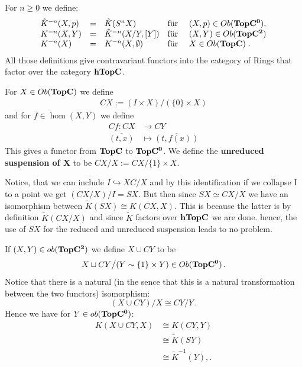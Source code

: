 \begin{definition}
	For $n\geq 0$ we define:
	\begin{align*}
		\begin{array}{lclll}
			\Tilde{K}^{-n}(X,p)&= &\Tilde{K}(S^nX)& \text{für } &(X,p)\in Ob(\operatorname{\mathbf{TopC^0}}),\\
			K^{-n}(X,Y)&= &\Tilde{K}^{-n}(X\slash Y,[Y]) &\text{für } &(X,Y)\in Ob(\operatorname{\mathbf{TopC^2}})\\
			K^{-n}(X) &= &K^{-n}(X,\emptyset) &\text{für } &X\in Ob(\operatorname{\mathbf{TopC}})~.
		\end{array}
	\end{align*}
	All those definitions give contravariant functors into the category of Rings that factor over the category $\operatorname{\mathbf{hTopC}}$.
\end{definition}
\begin{definition}\label{def: Cone on X}
	For $X\in Ob(\operatorname{\mathbf{TopC}})$ we define
	\begin{align*}
		CX:=(I\times X) \big/(\{0\}\times X)
	\end{align*} and for $f\in \hom(X,Y)$ we define 
	\begin{align*}
		Cf:CX &\to CY\\
		\overline{(t,x)}&\mapsto \overline{(t,f(x))}
	\end{align*} This gives a functor from $\operatorname{\mathbf{TopC}}$ to $\operatorname{\mathbf{TopC^0}}$.
	We define the \textbf{unreduced suspension of X} to be $CX\slash X := CX\slash \{1\}\times X$.
\end{definition}
\begin{corollary}
	Notice, that we can include $I\hookrightarrow XC\slash X $ and by this identification if we collapse I to a point we get $(CX\slash X)\big/ I =SX$. But then since $SX\simeq CX\slash X$ we have an isomorphism between $\tilde{K}(SX)\cong K(CX,X)$. This is because the latter is by definition $\tilde{K}(CX\slash X)$ and since $\tilde{K}$ factors over $\operatorname{\mathbf{hTopC}}$ we are done. hence, the use of $SX$ for the reduced and unreduced suspension leads to no problem.
\end{corollary}
\begin{corollary}\label{cor: first iso to reduction of K-group}
	If $(X,Y)\in ob(\operatorname{\mathbf{TopC^2}})$ we define $X\cup CY$ to be $$X\sqcup CY\big/(Y\sim \{1\}\times Y)\in Ob(\operatorname{\mathbf{TopC^0}})\, .$$ Notice that there is a natural (in the sence that this is a natural transformation between the two functors) isomorphism:
	\begin{equation}
		(X\cup CY) \big/ X \cong CY\slash Y\, .
	\end{equation}Hence we have for $Y\in ob(\operatorname{\mathbf{TopC^0}})$:
	\begin{align*}
		K(X\cup CY,X)&\cong K(CY,Y)\\
		&\cong \tilde{K}(SY)\\
		&\cong \tilde{K}^{-1}(Y),.
	\end{align*}
\end{corollary}
